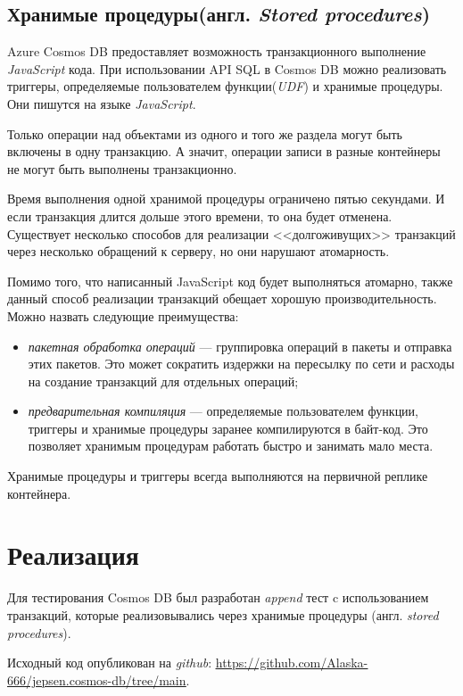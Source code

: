 \documentclass[12pt,  openany]{book}
\begin{document}
\subsection{Хранимые процедуры(англ. \textit{Stored procedures})}
Azure Cosmos DB предоставляет возможность транзакционного выполнение \textit{JavaScript} кода. При использовании API SQL в Cosmos DB можно реализовать триггеры, определяемые пользователем функции(\textit{UDF}) и хранимые процедуры.  Они пишутся на языке \textit{JavaScript}. 
\par Только операции над объектами из одного и того же раздела могут быть включены в одну транзакцию.  А значит, операции записи в разные контейнеры не могут быть выполнены транзакционно. 
\par Время выполнения одной хранимой процедуры ограничено пятью секундами.  И если транзакция длится дольше этого времени, то она будет отменена. Существует несколько способов для реализации <<долгоживущих>> транзакций через несколько обращений к серверу, но они нарушают атомарность.
\par Помимо того, что написанный JavaScript код будет выполняться атомарно, также данный способ реализации транзакций обещает хорошую производительность. Можно назвать следующие преимущества:
\begin{itemize}
\item \textit{пакетная обработка операций} --- группировка операций в пакеты и отправка этих пакетов. Это может сократить издержки на пересылку по сети и расходы на создание транзакций для отдельных операций; 
\item \textit{предварительная компиляция} --- определяемые пользователем функции, триггеры и хранимые процедуры заранее компилируются в байт-код.  Это позволяет хранимым процедурам работать быстро и занимать мало места.
\end{itemize}
\par
Хранимые процедуры и триггеры всегда выполняются на первичной реплике контейнера. 

\section{Реализация}
Для тестирования Cosmos DB был разработан \textit{append} тест c использованием транзакций, которые реализовывались через хранимые процедуры (англ. \textit{stored procedures}).  
\par Исходный код опубликован на \textit{github}: \newline 
\underline{\href{https://github.com/Alaska-666/jepsen.cosmos-db/tree/main}{https://github.com/Alaska-666/jepsen.cosmos-db/tree/main}}.
\end{document}
